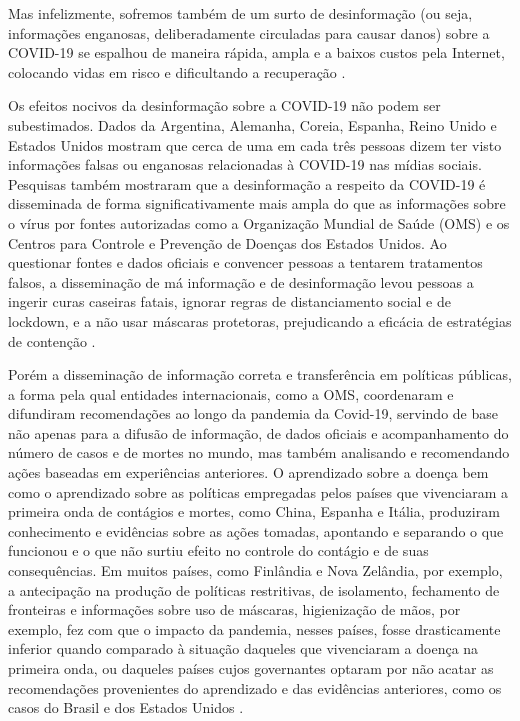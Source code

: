 Mas infelizmente, sofremos também de um surto de desinformação (ou seja, informações enganosas, deliberadamente circuladas para causar danos) sobre a COVID-19 se espalhou de maneira rápida, ampla e a baixos custos pela Internet, colocando vidas em risco e dificultando a recuperação \cite{Ocombate55:online}.

Os efeitos nocivos da desinformação sobre a COVID-19 não podem ser subestimados. Dados \cite{Navigati3:online} da Argentina, Alemanha, Coreia, Espanha, Reino Unido e Estados Unidos mostram que cerca de uma em cada três pessoas dizem ter visto informações falsas ou enganosas relacionadas à COVID-19 nas mídias sociais. Pesquisas também mostraram que a desinformação a respeito da COVID-19 é disseminada de forma significativamente mais ampla do que as informações sobre o vírus por fontes autorizadas como a Organização Mundial de Saúde (OMS) e os Centros para Controle e Prevenção de Doenças dos Estados Unidos. Ao questionar fontes e dados oficiais e convencer pessoas a tentarem tratamentos falsos, a disseminação de má informação e de desinformação levou pessoas a ingerir curas caseiras fatais, ignorar regras de distanciamento social e de lockdown, e a não usar máscaras protetoras, prejudicando a eficácia de estratégias de contenção \cite{Ocombate55:online}.

Porém a disseminação de informação correta e transferência em políticas públicas, a forma pela qual entidades internacionais, como a OMS, coordenaram e difundiram recomendações ao longo da pandemia da Covid-19, servindo de base não apenas para a difusão de informação, de dados oficiais e acompanhamento do número de casos e de mortes no mundo, mas também analisando e recomendando ações baseadas em experiências anteriores. O aprendizado sobre a doença bem como o aprendizado sobre as políticas empregadas pelos países que vivenciaram a primeira onda de contágios e mortes, como China, Espanha e Itália, produziram conhecimento e evidências sobre as ações tomadas, apontando e separando o que funcionou e o que não surtiu efeito no controle do contágio e de suas consequências. Em muitos países, como Finlândia e Nova Zelândia, por exemplo, a antecipação na produção de políticas restritivas, de isolamento, fechamento de fronteiras e informações sobre uso de máscaras, higienização de mãos, por exemplo, fez com que o impacto da pandemia, nesses países, fosse drasticamente inferior quando comparado à situação daqueles que vivenciaram a doença na primeira onda, ou daqueles países cujos governantes optaram por não acatar as recomendações provenientes do aprendizado e das evidências anteriores, como os casos do Brasil e dos Estados Unidos \cite{brasil2020estudos}. 

